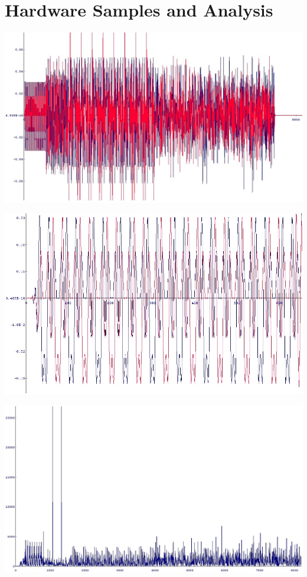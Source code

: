 \section{Hardware Samples and Analysis}
\label{hw_samples}

\begin{center}
\includegraphics[width=\textwidth]{content/fig/ofdmframe_chipscope.JPG}
\label{ofdmframe_chipscope}
\end{center}

\begin{center}
\includegraphics[width=\textwidth]{content/fig/sts_chipscope.JPG}
\label{sts_chipscope}
\end{center}

\begin{center}
\includegraphics[width=\textwidth]{content/fig/crosscorr.JPG}
\label{crosscorr}
\end{center}


